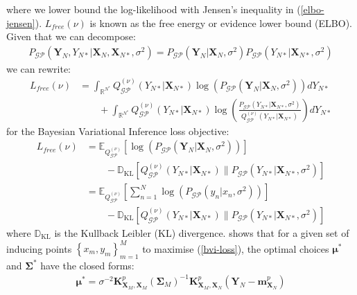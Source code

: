 \documentclass{article}
\newcommand{\KLD}{\operatorname{\mathbb{D}_{KL}}}
\newcommand{\GP}{\operatorname{\mathcal{GP}}}
\numberwithin{equation}{section}
\begin{document}
where we lower bound the log-likelihood with Jensen's inequality in (\ref{elbo-jensen}). $L_{free}(\nu)$ is known as the free energy or evidence lower bound (ELBO). Given that we can decompose:
\begin{align}
    P_{\GP}\left(\mathbf{Y}_N, Y_{N*} \vert \mathbf{X}_{N}, \mathbf{X}_{N*}, \sigma^2\right) = P_{\GP} \left(\mathbf{Y}_N \vert \mathbf{X}_{N}, \sigma^2\right) P_{\GP}\left(Y_{N*}\vert \mathbf{X}_{N*}, \sigma^2 \right)
    \label{decomposed-numerator}
\end{align}
we can rewrite:
\begin{align}
    L_{free}(\nu) &= \int_{\mathbb{R}^{N^*}} Q^{(\nu)}_{\GP}(Y_{N*} \vert \mathbf{X}_{N*}) \log \left(P_{\GP}\left(\mathbf{Y}_N \vert \mathbf{X}_{N}, \sigma^2\right)\right) d Y_{N*} \nonumber
    \\ & \qquad + \int_{\mathbb{R}^{N^*}} Q^{(\nu)}_{\GP}(Y_{N*} \vert \mathbf{X}_{N*}) \log \left(\frac{P_{\GP}\left( Y_{N*} \vert \mathbf{X}_{N*}, \sigma^2\right) }{Q^{(\nu)}_{\GP}\left(Y_{N*} \vert \mathbf{X}_{N*}\right)}\right) d Y_{N*}
    \label{elbo-broken-down}
\end{align}
for the Bayesian Variational Inference loss objective:
\begin{align}
    \label{bvi-loss}
    L_{free}(\nu) &=\mathbb{E}_{Q^{(\nu)}_{\GP}}\left[\log \left(P_{\GP}\left(\mathbf{Y}_N \vert \mathbf{X}_{N}, \sigma^2\right)\right)\right] \nonumber \\
    & \qquad - \KLD \left[Q^{(\nu)}_{\GP}\left(Y_{N*} \vert \mathbf{X}_{N*}\right) \| P_{\GP}\left( Y_{N*} \vert \mathbf{X}_{N*}, \sigma^2\right) \right] \\
    &=\mathbb{E}_{Q^{(\nu)}_{\GP}}\left[\sum_{n=1}^N\log \left(P_{\GP}\left(y_n \vert x_n, \sigma^2\right)\right)\right] \nonumber \\
    & \qquad - \KLD \left[Q^{(\nu)}_{\GP}\left(Y_{N*} \vert \mathbf{X}_{N*}\right) \| P_{\GP}\left( Y_{N*} \vert \mathbf{X}_{N*}, \sigma^2\right) \right]
    \label{bvi-loss-breakdown}
\end{align}
where $\KLD$ is the Kullback Leibler (KL) divergence.
\cite{titsias2009variational} shows that for a given set of inducing points $\left\{ x_m, y_m\right\}_{m=1}^M$ to maximise (\ref{bvi-loss}), the optimal choices $\boldsymbol{\mu}^*$ and $\mathbf{\Sigma}^*$ have the closed forms:
\begin{align}
    \label{svgp-optimal-mean}
    \boldsymbol{\mu}^* = \sigma^{-2}\mathbf{K}^p_{\mathbf{X}_M, \mathbf{X}_M}  \left(\mathbf{\Sigma}_M\right)^{-1}\mathbf{K}^p_{\mathbf{X}_M, \mathbf{X}_N}  \left(\mathbf{Y}_N - \mathbf{m}^p_{\mathbf{X}_N}\right)
\end{align}
\end{document}

